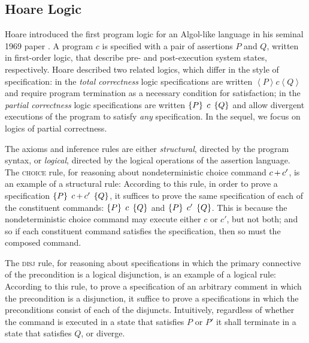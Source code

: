 \documentclass[11pt]{report}
\begin{document}
\subsection{Hoare Logic}
\label{sec:hoare-logic}

Hoare introduced the first program logic for an Algol-like language in his seminal 1969 paper \cite{DBLP:journals/cacm/Hoare69}. A program $c$ is specified with a pair of assertions $P$ and $Q$, written in first-order logic, that describe pre- and post-execution system states, respectively. Hoare described two related logics, which differ in the style of specification: in the \emph{total correctness} logic specifications are written $\left\langle P \right\rangle c \left\langle Q \right\rangle$ and require program termination as a necessary condition for satisfaction; in the \emph{partial correctness} logic specifications are written $\left\lbrace P \right\rbrace\;c\;\left\lbrace Q \right\rbrace$ and allow divergent executions of the program to satisfy \emph{any} specification. In the sequel, we focus on logics of partial correctness. 

The axioms and inference rules are either \emph{structural}, directed by the program syntax, or \emph{logical}, directed by the logical operations of the assertion language. The \textsc{choice} rule, for reasoning about nondeterministic choice command $c \operatorname{+} c'$, is an example of a structural rule:  According to this rule, in order to prove a specification $\left\lbrace P \right\rbrace\;c \operatorname{+} c'\;\left\lbrace Q \right\rbrace$, it suffices to prove the same specification of each of the constituent commands: $\left\lbrace P \right\rbrace\;c\;\left\lbrace Q \right\rbrace$ and $\left\lbrace P \right\rbrace\;c'\;\left\lbrace Q \right\rbrace$. This is because the nondeterministic choice command may execute either $c$ or $c'$, but not both; and so if each constituent command satisfies the specification, then so must the composed command. 

The \textsc{disj} rule, for reasoning about specifications in which the primary connective of the precondition is a logical disjunction, is an example of a logical rule:  According to this rule, to prove a specification of an arbitrary comment in which the precondition is a disjunction, it suffice to prove a specifications in which the preconditions consist of each of the disjuncts. Intuitively, regardless of whether the command is executed in a state that satisfies $P$ or $P'$ it shall terminate in a state that satisfies $Q$, or diverge. 
\end{document}
